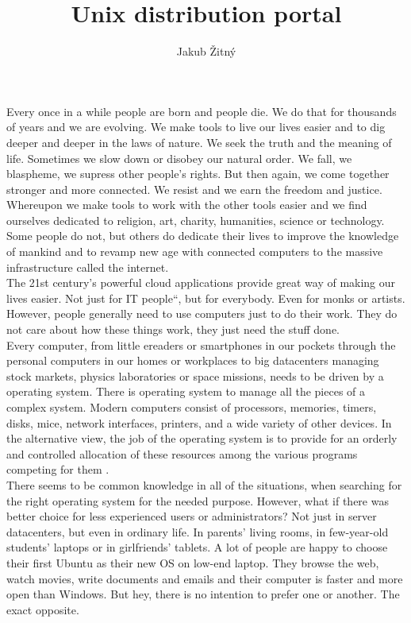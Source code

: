 \documentclass[thesis=B,english]{FITthesis}[2013/04/26]
\title{Unix distribution portal}
\author{Jakub Žitný}
\newcommand\q[1]{\quotedblbase #1\textquotedblleft}%
\begin{document}

\begin{introduction}
\label{section:introduction}

Every once in a while people are born and people die. We do that for thousands of years and we are evolving. We make tools to live our lives easier and to dig deeper and deeper in the laws of nature. We seek the truth and the meaning of life. Sometimes we slow down or disobey our natural order. We fall, we blaspheme, we supress other people’s rights. But then again, we come together stronger and more connected. We resist and we earn the freedom and justice. Whereupon we make tools to work with the other tools easier and we find ourselves dedicated to religion, art, charity, humanities, science or technology. Some people do not, but others do dedicate their lives to improve the knowledge of mankind and to revamp new age with connected computers to the massive infrastructure called the internet. \\

The 21st century’s powerful cloud applications provide great way of making our lives easier. Not just for \q{IT people}, but for everybody. Even for monks or artists. However, people generally need to use computers just to do their work. They do not care about how these things work, they just need the stuff done. \\

Every computer, from little ereaders or smartphones in our pockets through the personal computers in our homes or workplaces to big datacenters managing stock markets, physics laboratories or space missions, needs to be driven by a operating system. There is operating system to manage all the pieces of a complex system. Modern computers consist of processors, memories, timers, disks, mice, network interfaces, printers, and a wide variety of other devices. In the alternative view, the job of the operating system is to provide for an orderly and controlled allocation of these resources among the various programs competing for them \cite{tannenbaum}.\\

There seems to be common knowledge in all of the situations, when searching for the right operating system for the needed purpose. However, what if there was better choice for less experienced users or administrators? Not just in server datacenters, but even in ordinary life. In parents’ living rooms, in few-year-old students’ laptops or in girlfriends’ tablets. A lot of people are happy to choose their first Ubuntu as their new OS on low-end laptop. They browse the web, watch movies, write documents and emails and their computer is faster and more open than Windows. But hey, there is no intention to prefer one or another. The exact opposite. \\


\end{introduction}
\end{document}

